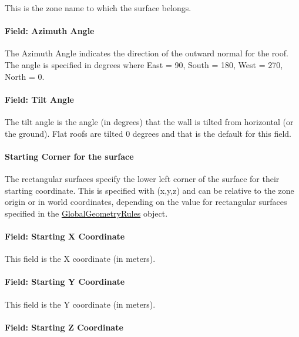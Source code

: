 This is the zone name to which the surface belongs.

\paragraph{Field: Azimuth Angle}\label{field-azimuth-angle-4}

The Azimuth Angle indicates the direction of the outward normal for the roof. The angle is specified in degrees where East = 90, South = 180, West = 270, North = 0.

\paragraph{Field: Tilt Angle}\label{field-tilt-angle-4}

The tilt angle is the angle (in degrees) that the wall is tilted from horizontal (or the ground). Flat roofs are tilted 0 degrees and that is the default for this field.

\paragraph{Starting Corner for the surface}\label{starting-corner-for-the-surface-4}

The rectangular surfaces specify the lower left corner of the surface for their starting coordinate. This is specified with (x,y,z) and can be relative to the zone origin or in world coordinates, depending on the value for rectangular surfaces specified in the \hyperref[globalgeometryrules]{GlobalGeometryRules} object.

\paragraph{Field: Starting X Coordinate}\label{field-starting-x-coordinate-4}

This field is the X coordinate (in meters).

\paragraph{Field: Starting Y Coordinate}\label{field-starting-y-coordinate-4}

This field is the Y coordinate (in meters).

\paragraph{Field: Starting Z Coordinate}\label{field-starting-z-coordinate-4}


